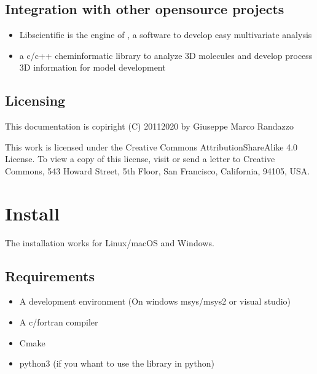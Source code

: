 \documentclass[letterpaper,10pt,english]{sphinxmanual}
\begin{document}
\section{Integration with other open\sphinxhyphen{}source projects}
\label{\detokenize{Overview:integration-with-other-open-source-projects}}\begin{itemize}
\item {} 
\sphinxAtStartPar
Libscientific is the engine of , a software to develop easy multivariate analysis

\item {} 
\sphinxAtStartPar
{} a c/c++ cheminformatic library to analyze 3D molecules and develop process 3D information for model development

\end{itemize}


\section{Licensing}
\label{\detokenize{Overview:licensing}}
\sphinxAtStartPar
This documentation is copiright (C) 2011\sphinxhyphen{}2020 by Giuseppe Marco Randazzo

\sphinxAtStartPar
This work is licensed under the Creative Commons Attribution\sphinxhyphen{}ShareAlike 4.0 License. To view a copy of this license, visit  or send a letter to Creative Commons, 543 Howard Street, 5th Floor, San Francisco, California, 94105, USA.

\sphinxstepscope


\chapter{Install}
\label{\detokenize{Install:install}}\label{\detokenize{Install::doc}}
\sphinxAtStartPar
The installation works for Linux/macOS and Windows.


\section{Requirements}
\label{\detokenize{Install:requirements}}\begin{itemize}
\item {} 
\sphinxAtStartPar
A development environment (On windows msys/msys2 or visual studio)

\item {} 
\sphinxAtStartPar
A c/fortran compiler

\item {} 
\sphinxAtStartPar
Cmake

\item {} 
\sphinxAtStartPar
python3 (if you whant to use the library in python)

\end{itemize}
\end{document}
